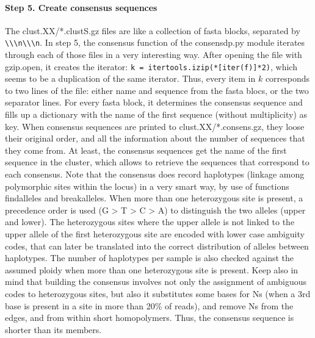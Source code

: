 \documentclass[a4paper,12pt,twosided]{article}
\begin{document}
\paragraph{Step 5. Create consensus sequences}
The clust.XX/*.clustS.gz files are like a collection of fasta blocks, separated by \verb+\\\n\\\n+. In step 5, the consensus function of the consensdp.py module iterates through each of those files in a very interesting way. After opening the file with gzip.open, it creates the iterator: \verb+k = itertools.izip(*[iter(f)]*2)+, which seems to be a duplication of the same iterator. Thus, every item in $k$ corresponds to two lines of the file: either name and sequence from the fasta blocs, or the two separator lines. For every fasta block, it determines the consensus sequence and fills up a dictionary with the name of the first sequence (without multiplicity) as key. When consensus sequences are printed to clust.XX/*.consens.gz, they loose their original order, and all the information about the number of sequences that they come from. At least, the consensus sequences get the name of the first sequence in the cluster, which allows to retrieve the sequences that correspond to each consensus. Note that the consensus does record haplotypes (linkage among polymorphic sites within the locus) in a very smart way, by use of functions findalleles and breakalleles. When more than one heterozygous site is present, a precedence order is used (G > T > C > A) to distinguish the two alleles (upper and lower). The heterozygous sites where the upper allele is not linked to the upper allele of the first heterozygous site are encoded with lower case ambiguity codes, that can later be translated into the correct distribution of alleles between haplotypes. The number of haplotypes per sample is also checked against the assumed ploidy when more than one heterozygous site is present. Keep also in mind that building the consensus involves not only the assignment of ambiguous codes to heterozygous sites, but also it substitutes some bases for Ns (when a 3rd base is present in a site in more than 20\% of reads), and remove Ns from the edges, and from within short homopolymers. Thus, the consensus sequence is shorter than its members.
\end{document}
